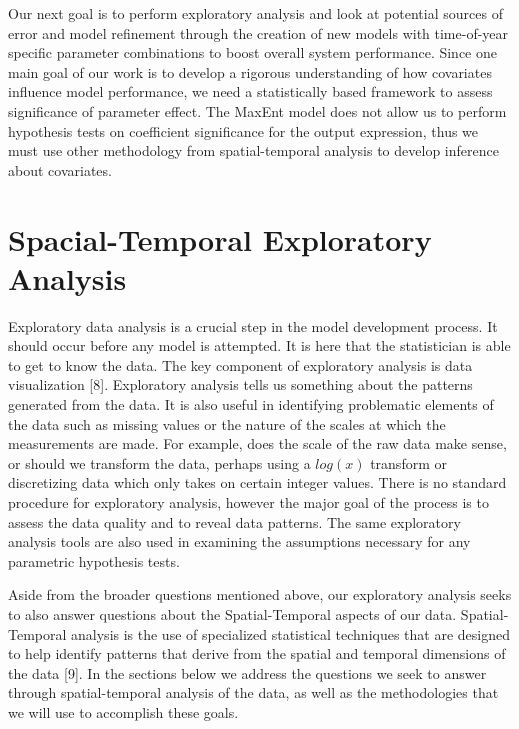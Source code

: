 \noindent Our next goal is to perform exploratory analysis and look at potential sources of error and model refinement through the creation of new models with time-of-year specific parameter combinations to boost overall system performance. Since one main goal of our work is to develop a rigorous understanding of how covariates influence model performance, we need a statistically based framework to assess significance of parameter effect. The MaxEnt model does not allow us to perform hypothesis tests on coefficient significance for the output expression, thus we must use other methodology from spatial-temporal analysis to develop inference about covariates. 


\section{Spacial-Temporal Exploratory Analysis} 

Exploratory data analysis is a crucial step in the model development process. It should occur before any model is attempted. It is here that the statistician is able to get to know the data. The key component of exploratory analysis is data visualization [8]. Exploratory analysis tells us something about the patterns generated from the data. It is also useful in identifying problematic elements of the data such as missing values or the nature of the scales at which the measurements are made. For example, does the scale of the raw data make sense, or should we transform the data, perhaps using a $log(x)$ transform or discretizing data which only takes on certain integer values. There is no standard procedure for exploratory analysis, however the major goal of the process is to  assess the data quality and to reveal data patterns. The same exploratory analysis tools are also used in examining the assumptions necessary for any parametric hypothesis tests.\newline

\noindent Aside from the broader questions mentioned above, our exploratory analysis seeks to also answer questions about the Spatial-Temporal aspects of our data. Spatial-Temporal analysis is the use of specialized statistical techniques that are designed to help identify patterns that derive from the spatial and temporal dimensions of the data [9].  In the sections below we address the questions we seek to answer through spatial-temporal analysis of the data, as well as the methodologies that we will use to accomplish these goals. \newline

